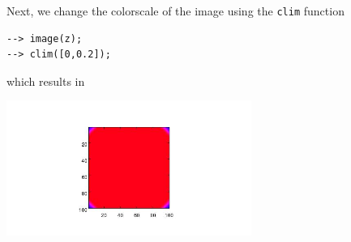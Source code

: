 Next, we change the colorscale of the image using the
 \verb|clim| function
\begin{verbatim}
--> image(z);
--> clim([0,0.2]);
\end{verbatim}
which results in


\centerline{\includegraphics[width=8cm]{clim2}}

